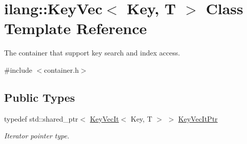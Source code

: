 \hypertarget{classilang_1_1_key_vec}{}\section{ilang\+:\+:Key\+Vec$<$ Key, T $>$ Class Template Reference}
\label{classilang_1_1_key_vec}


The container that support key search and index access.  




{\ttfamily \#include $<$container.\+h$>$}

\subsection*{Public Types}
\begin{DoxyCompactItemize}
\item 
\mbox{\label{classilang_1_1_key_vec_ab09bb9eca1480923cb6c88e709764935}} 
typedef std\+::shared\+\_\+ptr$<$ \mbox{\hyperlink{classilang_1_1_key_vec_it}{Key\+Vec\+It}}$<$ Key, T $>$ $>$ \mbox{\hyperlink{classilang_1_1_key_vec_ab09bb9eca1480923cb6c88e709764935}{Key\+Vec\+It\+Ptr}}
\begin{DoxyCompactList}\small\item\em Iterator pointer type. \end{DoxyCompactList}\end{DoxyCompactItemize}
